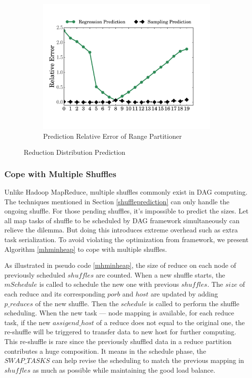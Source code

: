 \begin{figure}
\begin{subfigure}[b]{0.32\linewidth}
		\includegraphics[width=\linewidth]{fig/prediction_relative_error}
		\caption{Prediction Relative Error of Range Partitioner}
		\label{fig:prediction_relative_error}
	\end{subfigure}
	\caption{Reduction Distribution Prediction}
	\label{fig:dis}
\end{figure}

\subsubsection{Cope with Multiple Shuffles}
Unlike Hadoop MapReduce, multiple shuffles commonly exist in DAG computing. The techniques mentioned in Section \ref{shuffleprediction} can only handle the ongoing shuffle. For those pending shuffles, it's impossible to predict the sizes. Let all map tasks of shuffle to be scheduled by DAG framework simultaneously can relieve the dilemma. But doing this introduces extreme overhead such as extra task serialization. To avoid violating the optimization from framework, we present Algorithm \ref{mhminheap} to cope with multiple shuffles.

As illustrated in pseudo code \ref{mhminheap}, the size of reduce on each node of previously scheduled $shuffles$ are counted. When a new shuffle starts, the $mSchedule$ is called to schedule the new one with previous $shuffles$. The $size$ of each reduce and its corresponding $porb$ and $host$ are updated by adding $p\_reduces$ of the new shuffle. Then the $schedule$ is called to perform the shuffle scheduling. When the new task --- node mapping is available, for each reduce task, if the new $assigend\_host$ of a reduce does not equal to the original one, the re-shuffle will be triggered to transfer data to new host for further computing. This re-shuffle is rare since the previously shuffled data in a reduce partition contributes a huge composition. It means in the schedule phase, the $SWAP\_TASKS$ can help revise the scheduling to match the previous mapping in $shuffles$ as much as possible while maintaining the good load balance.

